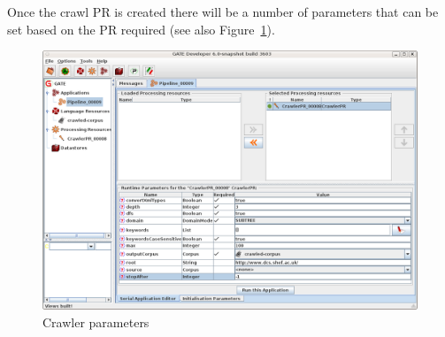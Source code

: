 Once the crawl PR is created there will be a number of parameters that can be
set based on the PR required (see also Figure~\ref{fig:crawler-parameters}).
%
\begin{figure}[htb]
  \begin{center}
    \includegraphics[width=\textwidth]{crawler-parameters.png}
  \end{center}
  \caption{Crawler parameters}
  \label{fig:crawler-parameters}
\end{figure}
% 
